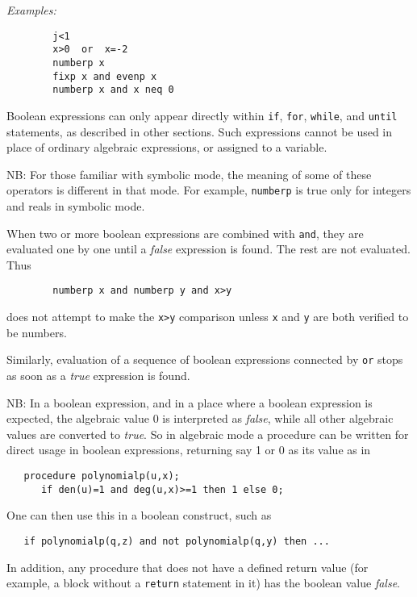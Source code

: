 \textit{Examples:}
\begin{verbatim}
        j<1
        x>0  or  x=-2
        numberp x
        fixp x and evenp x
        numberp x and x neq 0
\end{verbatim}
Boolean expressions can only appear directly within \texttt{if}, \texttt{for},
\texttt{while}, and \texttt{until} statements, as described in other sections.
Such expressions cannot be used in place of ordinary algebraic expressions,
or assigned to a variable.

NB:  For those familiar with symbolic mode, the meaning of some of
these operators is different in that mode.  For example, \texttt{numberp} is
true only for integers and reals in symbolic mode.

\hypertarget{operator:AND}{}
When two or more boolean expressions are combined with \texttt{and}, they are
evaluated one by one until a \emph{false} expression is found. The rest are
not evaluated. Thus
\begin{verbatim}
        numberp x and numberp y and x>y
\end{verbatim}
does not attempt to make the \texttt{x>y} comparison unless \texttt{x} and \texttt{y}
are both verified to be numbers.

\hypertarget{operator:OR}{}
Similarly, evaluation of a sequence of boolean expressions connected by
\texttt{or} stops as soon as a \emph{true} expression is found.

NB:  In a boolean expression, and in a place where a boolean expression is
expected, the algebraic value 0 is interpreted as \emph{false}, while all
other algebraic values are converted to \emph{true}.  So in algebraic mode
a procedure can be written for direct usage in boolean expressions,
returning say 1 or 0 as its value as in

\begin{verbatim}
   procedure polynomialp(u,x);
      if den(u)=1 and deg(u,x)>=1 then 1 else 0;
\end{verbatim}

One can then use this in a boolean construct, such as
\begin{verbatim}
   if polynomialp(q,z) and not polynomialp(q,y) then ...
\end{verbatim}

In addition, any procedure that does not have a defined return value
(for example, a block without a \texttt{return} statement in it)
has the boolean value \emph{false}.

